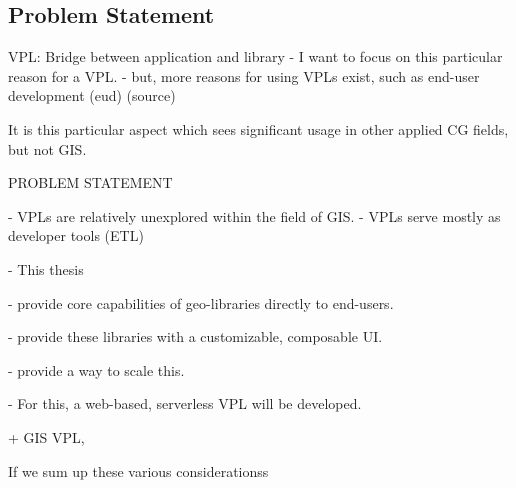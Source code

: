 


\subsection*{Problem Statement}
  
\begin{note}
  
VPL: Bridge between application and library
- I want to focus on this particular reason for a VPL. 
  - but, more reasons for using VPLs exist, such as end-user development (eud) (source)

It is this particular aspect which sees significant usage in other applied CG fields, but not GIS.



PROBLEM STATEMENT

- VPLs are relatively unexplored within the field of GIS. 
  - VPLs serve mostly as developer tools (ETL)
  
- This thesis 

   - provide core capabilities of geo-libraries directly to end-users.
     
   - provide these libraries with a customizable, composable UI.

   - provide a way to scale this.

- For this, a web-based, serverless VPL will be developed.

+ GIS VPL, 
 

If we sum up these various considerationss


\end{note}

